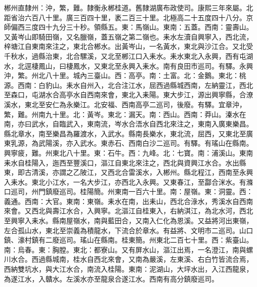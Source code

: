 \begin{pinyinscope}
郴州直隸州：沖，繁，難。隸衡永郴桂道。舊隸湖廣布政使司。康熙三年來屬。北距省治六百八十里。廣三百四十里，袤二百三十里。北極高二十五度四十八分。京師偏西三度四十九分三十秒。領縣五。東：馬嶺山。東南：五蓋。西南：靈壽山。又黃岑山即騎田嶺，又名臘嶺，蓋五嶺之第二嶺也。耒水左瀆自興寧入，西北流，梓塘江自東南來注之，東北合郴水。出黃岑山，一名黃水，東北與沙江合。又北受千秋水，過縣治東，北合騾溪，又北至郴江口入耒水。耒水東北入永興，西有屯湖水，北逕棲鳳山，曰棲鳳水，又東北至永興入耒水。南有良田市巡司。有驛。永興沖，繁。州北八十里。城內三臺山。西：高亭。南：土富。北：金鵝。東北：桃源。西南：白豹山。耒水自州入，北合注江水，屈西過縣城西南，左納靈江，西北至森口，屯湖水合高亭水自西南來會，東北入耒陽。東大步江，源出興寧縣，合潦溪水，東北至安仁為永樂江。北安福、西南高亭二巡司，後廢。有驛。宜章沖，繁，難。州南九十里。北：黃岑。東北：漏天。南：西山。西南：莽山。溱水在南，亦曰武水，自臨武入，東南流，岑水合浯水自西北來注之，東南入廣東樂昌。縣北章水，南至樂昌為羅渡水，入武水。縣南長樂水，東北流，屈西，又東北至廣東乳源，為武陽溪，亦入武水。東赤石、西南白沙二巡司。有驛。有瑤山在縣南。興寧疲，難。州東北八十里。東：石牛。西：九峰。北：七寶。南：浦溪山。東南耒水自桂陽入，迤西至豐溪口，漚江自東北來注之，西北與資興江水合。水出縣東，即古清溪，亦謂之乙陂江，又西北合雷溪水，入郴州。縣北程江，西南至永興入耒水。東北小江水，一名大步江，亦西北入永興。又東春江，至酃合洣水。有滌口巡司，州門鎮廢巡司。桂陽簡。州東南一百六十里。南：屋嶺。東：洞靈。西：義通。西南：大官。東南：東嶺。耒水在南，出耒山，西北合淥水，秀溪水自西南來會。又西北與壽江水合，入興寧。北漚江自桂東入，右納淇江，為北水河，西北至興寧入耒水。縣南屋嶺水，南與藍田合，又南入仁化為恩溪。又益將河出東嶺，左合孤山水，東北至崇義為積龍水，下流合於章水。有益將、文明市二巡司。山口鎮、濠村鎮有二廢巡司。瑤山在縣南。桂東簡。州東北二百七十里。西：紫臺山。南：烏春。東：胸膛。東北：都寮山。又有屏水山，漚江出焉，一名澄江，南與螺川水合。西過縣城南，桂水自西北來會，又南為嚴溪，左東溪、右白竹皆流合焉，西納雙坑水，與大江水合，南流入桂陽。東南：泥湖山，大坪水出，入江西龍泉，為遂江水，入贛水。左溪水亦至龍泉合遂江水。西南有高分鎮廢巡司。


\end{pinyinscope}
